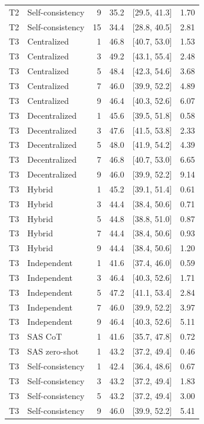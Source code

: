 \begin{tabular}{@{}llrrrr@{}}
T2 & Self-consistency & 9 & 35.2 & [29.5, 41.3] & 1.70 \\
T2 & Self-consistency & 15 & 34.4 & [28.8, 40.5] & 2.81 \\
T3 & Centralized & 1 & 46.8 & [40.7, 53.0] & 1.53 \\
T3 & Centralized & 3 & 49.2 & [43.1, 55.4] & 2.48 \\
T3 & Centralized & 5 & 48.4 & [42.3, 54.6] & 3.68 \\
T3 & Centralized & 7 & 46.0 & [39.9, 52.2] & 4.89 \\
T3 & Centralized & 9 & 46.4 & [40.3, 52.6] & 6.07 \\
T3 & Decentralized & 1 & 45.6 & [39.5, 51.8] & 0.58 \\
T3 & Decentralized & 3 & 47.6 & [41.5, 53.8] & 2.33 \\
T3 & Decentralized & 5 & 48.0 & [41.9, 54.2] & 4.39 \\
T3 & Decentralized & 7 & 46.8 & [40.7, 53.0] & 6.65 \\
T3 & Decentralized & 9 & 46.0 & [39.9, 52.2] & 9.14 \\
T3 & Hybrid & 1 & 45.2 & [39.1, 51.4] & 0.61 \\
T3 & Hybrid & 3 & 44.4 & [38.4, 50.6] & 0.71 \\
T3 & Hybrid & 5 & 44.8 & [38.8, 51.0] & 0.87 \\
T3 & Hybrid & 7 & 44.4 & [38.4, 50.6] & 0.93 \\
T3 & Hybrid & 9 & 44.4 & [38.4, 50.6] & 1.20 \\
T3 & Independent & 1 & 41.6 & [37.4, 46.0] & 0.59 \\
T3 & Independent & 3 & 46.4 & [40.3, 52.6] & 1.71 \\
T3 & Independent & 5 & 47.2 & [41.1, 53.4] & 2.84 \\
T3 & Independent & 7 & 46.0 & [39.9, 52.2] & 3.97 \\
T3 & Independent & 9 & 46.4 & [40.3, 52.6] & 5.11 \\
T3 & SAS CoT & 1 & 41.6 & [35.7, 47.8] & 0.72 \\
T3 & SAS zero-shot & 1 & 43.2 & [37.2, 49.4] & 0.46 \\
T3 & Self-consistency & 1 & 42.4 & [36.4, 48.6] & 0.67 \\
T3 & Self-consistency & 3 & 43.2 & [37.2, 49.4] & 1.83 \\
T3 & Self-consistency & 5 & 43.2 & [37.2, 49.4] & 3.00 \\
T3 & Self-consistency & 9 & 46.0 & [39.9, 52.2] & 5.41 \\

\end{tabular}
